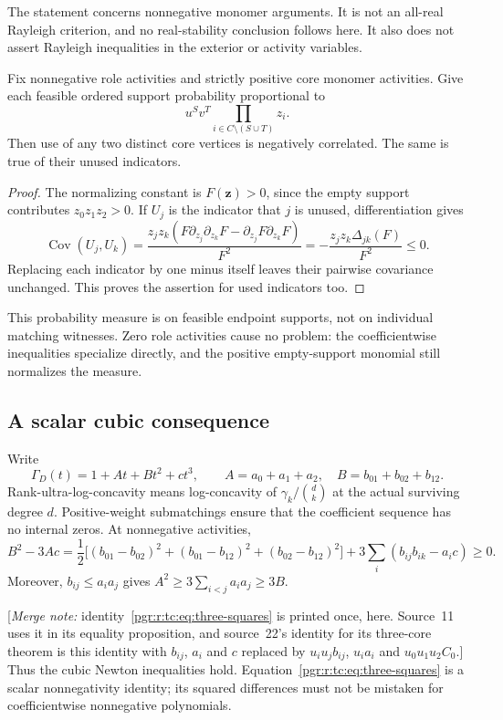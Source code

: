 \documentclass[11pt]{article}
\numberwithin{equation}{section}
\theoremstyle{definition}\newtheorem{definition}[theorem]{Definition}\newtheorem{remark}[theorem]{Remark}
\newcommand{\Ga}{\Gamma}                   %
\newcommand{\mnote}[1]{[\textit{Merge note:} #1]}
\begin{document}
The statement concerns nonnegative monomer arguments. It is not an all-real
Rayleigh criterion, and no real-stability conclusion follows here. It also
does not assert Rayleigh inequalities in the exterior or activity variables.

\begin{corollary}\label{pgr:r:tc:cor:covariance}
Fix nonnegative role activities and strictly positive core monomer activities.
Give each feasible ordered support probability proportional to
\[
 u^Sv^T\prod_{i\in C\setminus(S\cup T)}z_i.
\]
Then use of any two distinct core vertices is negatively correlated. The
same is true of their unused indicators.
\end{corollary}
\begin{proof}
The normalizing constant is $F(\mathbf z)>0$, since the empty support
contributes $z_0z_1z_2>0$. If $U_j$ is the indicator that $j$ is unused,
differentiation gives
\[
 \operatorname{Cov}(U_j,U_k)
 =\frac{z_jz_k(F\partial_{z_j}\partial_{z_k}F
                    -\partial_{z_j}F\partial_{z_k}F)}{F^2}
 =-\frac{z_jz_k\Delta_{jk}(F)}{F^2}\le0.
\]
Replacing each indicator by one minus itself leaves their pairwise covariance
unchanged. This proves the assertion for used indicators too.
\end{proof}
This probability measure is on feasible endpoint supports, not on individual
matching witnesses. Zero role activities cause no problem: the coefficientwise
inequalities specialize directly, and the positive empty-support monomial
still normalizes the measure.

\subsection{A scalar cubic consequence}
Write
\[
\Ga_D(t)=1+At+Bt^2+ct^3,\qquad
 A=a_0+a_1+a_2,\quad B=b_{01}+b_{02}+b_{12}.
\]
Rank-ultra-log-concavity means log-concavity of
$\gamma_k/\binom dk$ at the actual surviving degree $d$. Positive-weight
submatchings ensure that the coefficient sequence has no internal zeros.
At nonnegative activities,
\begin{equation}\label{pgr:r:tc:eq:three-squares}
 B^2-3Ac=
 \frac12\bigl[(b_{01}-b_{02})^2+(b_{01}-b_{12})^2
                         +(b_{02}-b_{12})^2\bigr]
 +3\sum_i(b_{ij}b_{ik}-a_ic)\ge0.
\end{equation}
Moreover, $b_{ij}\le a_ia_j$ gives
$A^2\ge3\sum_{i<j}a_ia_j\ge3B$.

\mnote{identity~\eqref{pgr:r:tc:eq:three-squares} is printed once, here. Source~11 uses
it in its equality proposition, and source~22's identity for its
three-core theorem is this identity with $b_{ij}$, $a_i$ and $c$ replaced by
$u_iu_jb_{ij}$, $u_ia_i$ and $u_0u_1u_2C_0$.}
Thus the cubic Newton inequalities hold. Equation~\eqref{pgr:r:tc:eq:three-squares}
is a scalar nonnegativity identity; its squared differences must not be
mistaken for coefficientwise nonnegative polynomials.
\end{document}
